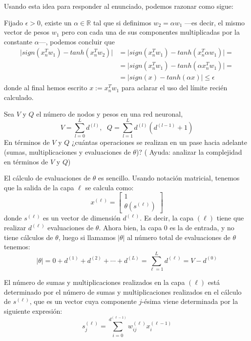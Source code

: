 \documentclass[a4paper, 11pt]{article}
\begin{document}
\begin{solucion}
\begin{solucion}
          Usando esta idea para responder al enunciado, podemos razonar como sigue:

          Fijado $\epsilon > 0$, existe un $\alpha \in \mathbb{R}$ tal que si definimos $w_2 = \alpha w_1$ ---es decir, el mismo vector de pesos $w_1$ pero con cada una de sus componentes multiplicadas por la constante $\alpha$---, podemos concluir que
          \begin{align*}
              \vert sign(x_n^Tw_1) - tanh(x_n^Tw_2) \vert &= \vert sign(x_n^Tw_1) - tanh(x_n^T\alpha w_1) \vert =\\
              &= \vert sign(x_n^Tw_1) - tanh(\alpha x_n^Tw_1) \vert = \\
              &= \vert sign(x) - tanh(\alpha x) \vert  \leq \epsilon
          \end{align*}
          donde al final hemos escrito $x := x_n^Tw_1$ para aclarar el uso del límite recién calculado.
      \end{solucion}

      \begin{ejercicio}
          Sea $V$ y $Q$ el número de nodos y pesos en una red neuronal,
          \[
          V=\sum_{l=0}^L d^{(l)}, \,\;\,
          Q=\sum_{l=1}^L d^{(l)}(d^{(l-1)}+1)
          \]
          En términos de $V$ y $Q$ ¿cuántas operaciones se realizan en un pase hacia adelante (sumas, multiplicaciones y evaluaciones de $\theta$)? ( Ayuda: analizar la complejidad en términos de $V$ y $Q$)
      \end{ejercicio}

      \begin{solucion}
        El cálculo de evaluaciones de $\theta$ es sencillo. Usando notación matricial, tenemos que la salida de la capa $\ell$ se calcula como:
        \[
        x^{(\ell)} = \begin{bmatrix}
            1\\
            \theta(s^{(\ell)})
        \end{bmatrix}
        \]
         donde $s^{(\ell)}$ es un vector de dimensión $d^{(\ell)}$. Es decir, la capa ${(\ell)}$ tiene que realizar $d^{(\ell)}$ evaluaciones de $\theta$. Ahora bien, la capa 0 es la de entrada, y no tiene cálculos de $\theta$, luego si llamamos $\vert\theta\vert$ al número total de evaluaciones de $\theta$ tenemos:
         \[
         \vert\theta\vert = 0 + d^{(1)} + d^{(2)} + \cdots + d^{(L)} = \sum_{\ell=1}^L d^{(\ell)} = V - d^{(0)}
         \]

         El número de sumas y multiplicaciones realizados en la capa ${(\ell)}$ está determinado por el número de sumas y multiplicaciones realizados en el cálculo de $s^{(\ell)}$, que es un vector cuya componente $j$-ésima viene determinada por la siguiente expresión:
         \[
         s_j^{(\ell)} = \sum_{i=0}^{d^{(\ell-1)}} w_{ij}^{(\ell)} x_i^{(\ell-1)}
         \]


\end{solucion}
\end{solucion}
\end{document}

